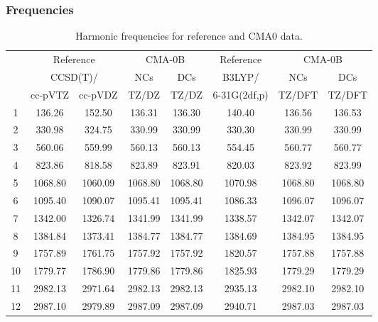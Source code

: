 \documentclass[10pt,oneside]{article}
\begin{document}
\clearpage

\subsubsection*{Frequencies}
\begin{table}[h!]
\centering
\caption{Harmonic frequencies for reference and CMA0 data.}
\begin{tabular}{cccccccc}
\toprule
{} & \multicolumn{2}{c}{Reference} & \multicolumn{2}{c}{CMA-0B} &    Reference & \multicolumn{2}{c}{CMA-0B} \\
{} & \multicolumn{2}{c}{CCSD(T)/} &     NCs &     DCs &       B3LYP/ &     NCs &     DCs \\
{} &   cc-pVTZ & cc-pVDZ &   TZ/DZ &   TZ/DZ & 6-31G(2df,p) &  TZ/DFT &  TZ/DFT \\
\midrule
1  &    136.26 &  152.50 &  136.31 &  136.30 &       140.40 &  136.56 &  136.53 \\
2  &    330.98 &  324.75 &  330.99 &  330.99 &       330.30 &  330.99 &  330.99 \\
3  &    560.06 &  559.99 &  560.13 &  560.13 &       554.45 &  560.77 &  560.77 \\
4  &    823.86 &  818.58 &  823.89 &  823.91 &       820.03 &  823.92 &  823.99 \\
5  &   1068.80 & 1060.09 & 1068.80 & 1068.80 &      1070.98 & 1068.80 & 1068.80 \\
6  &   1095.40 & 1090.07 & 1095.41 & 1095.41 &      1086.33 & 1096.07 & 1096.07 \\
7  &   1342.00 & 1326.74 & 1341.99 & 1341.99 &      1338.57 & 1342.07 & 1342.07 \\
8  &   1384.84 & 1373.41 & 1384.77 & 1384.77 &      1384.69 & 1384.95 & 1384.95 \\
9  &   1757.89 & 1761.75 & 1757.92 & 1757.92 &      1820.57 & 1757.88 & 1757.88 \\
10 &   1779.77 & 1786.90 & 1779.86 & 1779.86 &      1825.93 & 1779.29 & 1779.29 \\
11 &   2982.13 & 2971.64 & 2982.13 & 2982.13 &      2935.13 & 2982.10 & 2982.10 \\
12 &   2987.10 & 2979.89 & 2987.09 & 2987.09 &      2940.71 & 2987.03 & 2987.03 \\
\bottomrule
\end{tabular}
\end{table}

\clearpage
\end{document}
